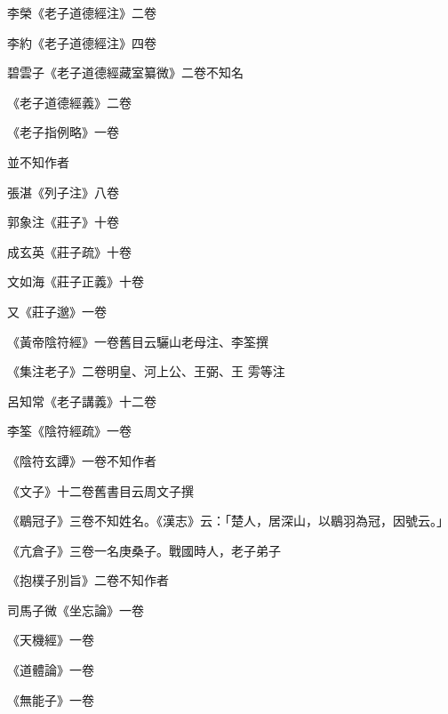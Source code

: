 \begin{pinyinscope}
 李榮《老子道德經注》二卷



 李約《老子道德經注》四卷



 碧雲子《老子道德經藏室纂微》二卷不知名



 《老子道德經義》二卷



 《老子指例略》一卷



 並不知作者



 張湛《列子注》八卷



 郭象注《莊子》十卷



 成玄英《莊子疏》十卷



 文如海《莊子正義》十卷



 又《莊子邈》一卷



 《黃帝陰符經》一卷舊目云驪山老母注、李筌撰



 《集注老子》二卷明皇、河上公、王弼、王
 雱等注



 呂知常《老子講義》十二卷



 李筌《陰符經疏》一卷



 《陰符玄譚》一卷不知作者



 《文子》十二卷舊書目云周文子撰



 《鶡冠子》三卷不知姓名。《漢志》云：「楚人，居深山，以鶡羽為冠，因號云。」



 《亢倉子》三卷一名庚桑子。戰國時人，老子弟子



 《抱樸子別旨》二卷不知作者



 司馬子微《坐忘論》一卷



 《天機經》一卷



 《道體論》一卷



 《無能子》一卷




\end{pinyinscope}
